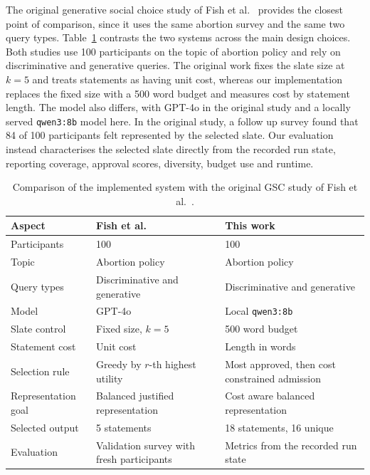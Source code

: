 \documentclass[letterpaper,11pt]{article}
\theoremstyle{plain}
\theoremstyle{definition}
\begin{document}
The original generative social choice study of Fish et al.~\citep{fish2026gsc} provides the closest point of comparison, since it uses the same abortion survey and the same two query types. Table~\ref{tab:comparison} contrasts the two systems across the main design choices. Both studies use 100 participants on the topic of abortion policy and rely on discriminative and generative queries. The original work fixes the slate size at $k=5$ and treats statements as having unit cost, whereas our implementation replaces the fixed size with a 500 word budget and measures cost by statement length. The model also differs, with GPT-4o in the original study and a locally served \texttt{qwen3:8b} model here. In the original study, a follow up survey found that 84 of 100 participants felt represented by the selected slate. Our evaluation instead characterises the selected slate directly from the recorded run state, reporting coverage, approval scores, diversity, budget use and runtime.

\begin{table}[htb]
\centering
\caption{{Comparison of the implemented system with the original GSC study of Fish et al.~\citep{fish2026gsc}.}}
\label{tab:comparison}
\begin{tabular}{lll}
\toprule
Aspect & Fish et al.~\citep{fish2026gsc} & This work \\
\midrule
Participants & 100 & 100 \\
Topic & Abortion policy & Abortion policy \\
Query types & Discriminative and generative & Discriminative and generative \\
Model & GPT-4o & Local \texttt{qwen3:8b} \\
Slate control & Fixed size, $k=5$ & 500 word budget \\
Statement cost & Unit cost & Length in words \\
Selection rule & Greedy by $r$-th highest utility & Most approved, then cost constrained admission \\
Representation goal & Balanced justified representation & Cost aware balanced representation \\
Selected output & 5 statements & 18 statements, 16 unique \\
Evaluation & Validation survey with fresh participants & Metrics from the recorded run state \\
\bottomrule
\end{tabular}
\end{table}
\end{document}
